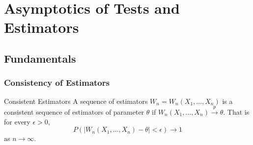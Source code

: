 \documentclass[../main]{subfiles}
\begin{document}
\chapter{Asymptotics of Tests and Estimators}
\section{Fundamentals}
\subsection{Consistency of Estimators}
\begin{gbox}{Consistent Estimators}
    A sequence of estimators $W_n = W_n(X_1,\dots, X_n)$ is a consistent sequence of estimators of parameter $\theta$ if $W_n(X_1,\dots,X_n) \overset{p}{\to}\theta $. That is for every $\epsilon > 0$,
    \[
    P(\left|W_n(X_1,\dots,X_n) - \theta \right| < \epsilon) \to 1
    \] as $n\to \infty$.
\end{gbox}
\end{document}
